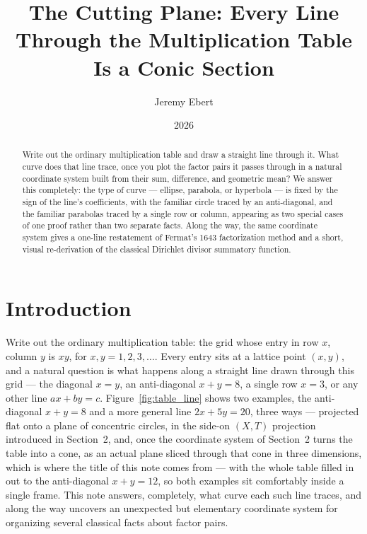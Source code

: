 \documentclass[11pt]{amsart}
\title{The Cutting Plane: Every Line Through the Multiplication Table Is a Conic Section}
\author{Jeremy Ebert}
\date{2026}
\theoremstyle{remark}
\begin{document}
\maketitle

\begin{abstract}
Write out the ordinary multiplication table and draw a straight line through it. What curve does that line trace, once you plot the factor pairs it passes through in a natural coordinate system built from their sum, difference, and geometric mean? We answer this completely: the type of curve --- ellipse, parabola, or hyperbola --- is fixed by the sign of the line's coefficients, with the familiar circle traced by an anti-diagonal, and the familiar parabolas traced by a single row or column, appearing as two special cases of one proof rather than two separate facts. Along the way, the same coordinate system gives a one-line restatement of Fermat's 1643 factorization method and a short, visual re-derivation of the classical Dirichlet divisor summatory function.
\end{abstract}

\section{Introduction}

Write out the ordinary multiplication table: the grid whose entry in row $x$, column $y$ is $xy$, for $x,y=1,2,3,\dots$. Every entry sits at a lattice point $(x,y)$, and a natural question is what happens along a straight line drawn through this grid --- the diagonal $x=y$, an anti-diagonal $x+y=8$, a single row $x=3$, or any other line $ax+by=c$. Figure~\ref{fig:table_line} shows two examples, the anti-diagonal $x+y=8$ and a more general line $2x+5y=20$, three ways --- projected flat onto a plane of concentric circles, in the side-on $(X,T)$ projection introduced in Section~2, and, once the coordinate system of Section~2 turns the table into a cone, as an actual plane sliced through that cone in three dimensions, which is where the title of this note comes from --- with the whole table filled in out to the anti-diagonal $x+y=12$, so both examples sit comfortably inside a single frame. This note answers, completely, what curve each such line traces, and along the way uncovers an unexpected but elementary coordinate system for organizing several classical facts about factor pairs.
\end{document}
